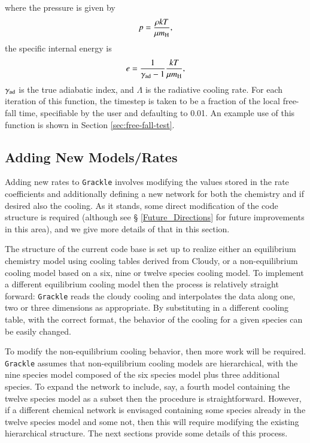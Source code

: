 where the pressure is given by
\begin{equation}
p = \frac{\rho k T}{\mu m_{\rm H}},
\end{equation}
the specific internal energy is
\begin{equation}
e = \frac{1}{\gamma_{\rm ad} -1} \frac{k T}{\mu m_{\rm H}},
\label{eq:defen}
\end{equation}
$\gamma_{\rm ad}$ is the true adiabatic index, and $\Lambda$ is the
radiative cooling rate.  For each iteration of this function, the
timestep is taken to be a fraction of the local free-fall time,
specifiable by the user and defaulting to 0.01.  An example use of
this function is shown in Section \ref{sec:free-fall-test}.


\subsection{Adding New Models/Rates}

Adding new rates to \texttt{Grackle} involves modifying the values stored in
the rate coefficients and additionally defining a new network for both
the chemistry and if desired also the cooling. As it stands, some
direct modification of the code structure is required (although see \S
\ref{Future_Directions} for future improvements in this area), and we
give more details of that in this section.

The structure of the current code base is set up to realize either an
equilibrium chemistry model using cooling tables derived from Cloudy,
or a non-equilibrium cooling model based on a six, nine or twelve
species cooling model.  To implement a different equilibrium cooling
model then the process is relatively straight forward: \texttt{Grackle} reads
the cloudy cooling and interpolates the data along one, two or three
dimensions as appropriate. By substituting in a different cooling
table, with the correct format, the behavior of the cooling for a
given species can be easily changed.

To modify the non-equilibrium cooling behavior, then more work will be
required. \texttt{Grackle} assumes that non-equilibrium cooling models are
hierarchical, with the nine species model composed of the six species
model plus three additional species.  To expand the network to
include, say, a fourth model containing the twelve species model as a
subset then the procedure is straightforward. However, if a different
chemical network is envisaged containing some species already in the
twelve species model and some not, then this will require modifying
the existing hierarchical structure.  The next sections provide some
details of this process.

